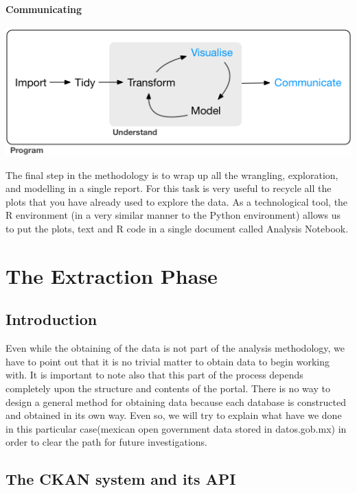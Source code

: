 \documentclass[]{book}
\begin{document}
\subsubsection{Communicating}\label{communicating}

\includegraphics{diagrams/data-science-communicate.png}

The final step in the methodology is to wrap up all the wrangling,
exploration, and modelling in a single report. For this task is very
useful to recycle all the plots that you have already used to explore
the data. As a technological tool, the R environment (in a very similar
manner to the Python environment) allows us to put the plots, text and R
code in a single document called Analysis Notebook.

\chapter{The Extraction Phase}\label{the-extraction-phase}

\section{Introduction}\label{introduction-1}

Even while the obtaining of the data is not part of the analysis
methodology, we have to point out that it is no trivial matter to obtain
data to begin working with. It is important to note also that this part
of the process depends completely upon the structure and contents of the
portal. There is no way to design a general method for obtaining data
because each database is constructed and obtained in its own way. Even
so, we will try to explain what have we done in this particular
case(mexican open government data stored in datos.gob.mx) in order to
clear the path for future investigations.

\section{The CKAN system and its API}\label{the-ckan-system-and-its-api}
\end{document}
